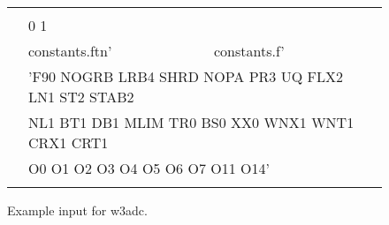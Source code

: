 \setlength{\unitlength}{0.1mm}

\begin{figure}

\begin{center} {\code \begin{tabular}{|cllc|} \hline
 & & &  \\
 & \multicolumn{2}{l}{0 1}        & \\ 
 & constants.ftn' & constants.f'  & \\
 & \multicolumn{2}{l}{'F90 NOGRB LRB4 SHRD NOPA PR3 UQ FLX2 LN1 ST2 STAB2}& \\
 & \multicolumn{2}{l}{\strut\hspace{5mm} NL1 BT1 DB1 MLIM TR0 BS0 XX0 WNX1 WNT1 CRX1 CRT1 }& \\
 & \multicolumn{2}{l}{\strut\hspace{5mm} O0 O1 O2 O3 O4 O5 O6 O7 O11 O14'}& \\
 &               &             & \\ \hline
\end{tabular} } \end{center} 
\caption{Example input for {\F w3adc}.} \label{fig:w3adc}

\botline
\end{figure}
